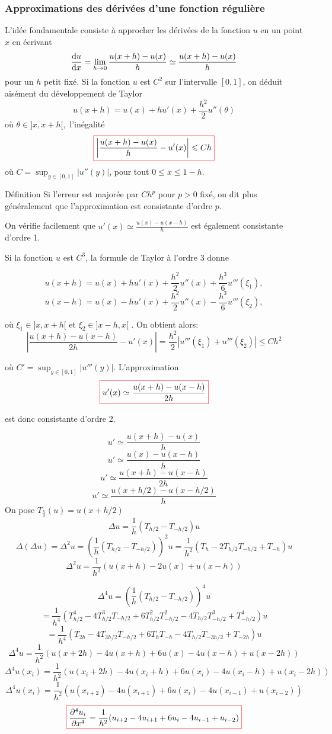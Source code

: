 \documentclass{beamer}
\def \de {{\rm d}}
\newcommand{\myredbox}[1]{\fcolorbox{red}{white}{$\displaystyle#1$}}
\begin{document}
\begin{frame}
\frametitle{Approximations des dérivées d'une fonction régulière}
 L'idée fondamentale consiste à approcher les dérivées de la fonction $u$ en un point $x$ en écrivant
\[\frac{\de u}{\de x} =\lim_{h\to 0} \frac{u(x+h)-u(x)}{h}\simeq  \frac{u(x+h)-u(x)}{h} \]
pour un $h$ petit fixé. 
 Si la fonction $u$ est $C^2$ sur l'intervalle $[0, 1]$, on déduit aisément du développement de Taylor
\[u(x+h)=u(x)+h u'(x)+\frac{h^2}2 u''(\theta) \]
où $\theta \in ]x, x + h[,$ l'inégalité
\[\myredbox{\left|\frac{u(x+h)-u(x)}h- u'(x)\right| \leqslant C h }\]
 où $C = \sup_{y\in [0,1]} |u''(y)|$, pour tout $0 \leqslant x \leqslant 1 - h$.
\begin{block}{Définition}
Si l'erreur est majorée par $C h^p$ pour $p > 0$ fixé, on dit plus généralement que l'approximation est consistante d'ordre $p$.
\end{block}


\end{frame}

\begin{frame}
On vérifie facilement que $u'(x) \simeq \frac{u(x) - u(x - h)}h$
est également consistante d'ordre 1.

Si la fonction $u$ est $C^3$, la formule de Taylor à l'ordre 3 donne

\[u(x+h)=u(x)+h u'(x)+\frac{h^2}2 u''(x)+\frac{h^3}6 u'''(\xi_1) ,\]
\[u(x-h)=u(x)-h u'(x)+\frac{h^2}2 u''(x)-\frac{h^3}6 u'''(\xi_2) ,\]

où $\xi_1\in ]x,x+h[$ et $\xi_2\in ]x-h,x[$ . On obtient alors:
\[\left| \frac{u(x+h)-u(x-h)}{2h}- u'(x) \right|=\frac{h^2}{2}\left| u'''(\xi_1)+u'''(\xi_2) \right|  \leqslant C h^2 \]




 où $C'=\sup_{y\in[0,1]} |u'''(y)|$. L'approximation
\[\myredbox{u'(x)\simeq \frac{u(x+h)-u(x-h)}{2h}}\] 
 
est donc consistante d'ordre 2.
\end{frame}
\begin{frame}
\[u'\simeq  \frac{u(x+h)-u(x)}{h}\]
\[u'\simeq  \frac{u(x)-u(x-h)}{h}\]
\[u'\simeq  \frac{u(x+h)-u(x-h)}{2h}\]
\[u'\simeq  \frac{u(x+h/2)-u(x-h/2)}{h}\]
On pose $T_{\frac h2}(u)=u(x+h/2)$
\[\Delta u=\frac 1h(T_{h/2}-T_{-h/2})u\]
\[\Delta(\Delta u)=\Delta^2u=\left(\frac 1h(T_{h/2}-T_{-h/2})\right)^2u=\frac 1{h^2}(T_h-2T_{h/2}T_{-h/2}+T_{-h})u\]
\[\Delta^2u=\frac 1{h^2}(u(x+h)-2u(x)+u(x-h))\]

\end{frame}
\begin{frame}

\[\Delta^4u=\left(\frac 1h(T_{h/2}-T_{-h/2})\right)^4u\]\[=\frac 1{h^4}(T^4_{h/2}-4T^3_{h/2}T_{-h/2}+6T^2_{h/2}T^2_{-h/2}-4T_{h/2}T^3_{-h/2}+T^4_{-h/2})u\]
\[=\frac 1{h^4}(T_{2h}-4T_{3h/2}T_{-h/2}+6T_{h}T_{-h}-4T_{h/2}T_{-3h/2}+T_{-2h})u\]
\[\Delta^4u=\frac 1{h^2}(u(x+2h)-4u(x+h)+6u(x)-4u(x-h)+u(x-2h))\]
\[\Delta^4u(x_i)=\frac 1{h^2}(u(x_i+2h)-4u(x_i+h)+6u(x_i)-4u(x_i-h)+u(x_i-2h))\]
\[\Delta^4u(x_i)=\frac 1{h^2}(u(x_{i+2})-4u(x_{i+1})+6u(x_i)-4u(x_{i-1})+u(x_{i-2}))\]
\[\myredbox{\frac{\partial^4 u_i}{\partial x^4}=\frac 1{h^2}(u_{i+2}-4u_{i+1}+6u_i-4u_{i-1}+u_{i-2})}\]

\end{frame}
\end{document}
